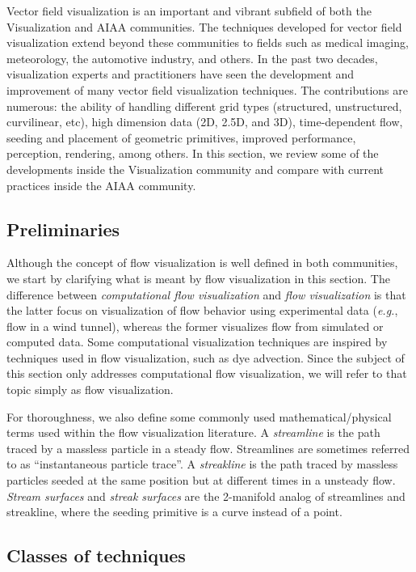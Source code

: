 Vector field visualization is an important and vibrant subfield of both the Visualization and AIAA communities.
%
The techniques developed for vector field visualization extend beyond these communities to fields such as medical imaging, meteorology, the automotive industry, and others.
%
In the past two decades, visualization experts and practitioners have seen the development and improvement of many vector field visualization techniques.
%
The contributions are numerous: the ability of handling different grid types (structured, unstructured, curvilinear, etc), high dimension data (2D, 2.5D, and 3D), time-dependent flow, seeding and placement of geometric primitives, improved performance, perception, rendering, among others.
%
In this section, we review some of the developments inside the Visualization community and compare with current practices inside the AIAA community.

\subsection{Preliminaries}

Although the concept of flow visualization is well defined in both communities, we start by clarifying what is meant by flow visualization in this section.
%
The difference between \emph{computational flow visualization} and \emph{flow visualization} is that the latter focus on visualization of flow behavior using experimental data (\emph{e.g.}, flow in a wind tunnel), whereas the former visualizes flow from simulated or computed data. 
%
Some computational visualization techniques are inspired by techniques used in flow visualization, such as dye advection. 
%
Since the subject of this section only addresses computational flow visualization, we will refer to that topic simply as flow visualization.

For thoroughness, we also define some commonly used mathematical/physical terms used within the flow visualization literature.
A \emph{streamline} is the path traced by a massless particle in a steady flow. Streamlines are sometimes referred to as ``instantaneous particle trace''.
%
A \emph{streakline} is the path traced by massless particles seeded at the same position but at different times in a unsteady flow. 
%
\emph{Stream surfaces} and \emph{streak surfaces} are the 2-manifold analog of streamlines and streakline, where the seeding primitive is a curve instead of a point.

\subsection{Classes of techniques}

